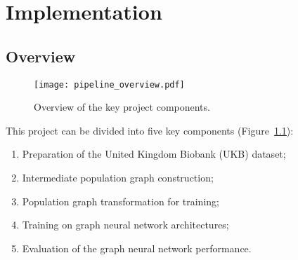 \chapter{Implementation}


\section{Overview}

\begin{figure}[]
    \centering
    \texttt{[image: pipeline\_overview.pdf]}
    \caption{Overview of the key project components.}\label{pipeline-overview}
\end{figure}

This project can be divided into five key components (Figure~\ref{pipeline-overview}):
\begin{enumerate}
    \item Preparation of the United Kingdom Biobank (UKB) dataset;
    \item Intermediate population graph construction;
    \item Population graph transformation for training;
    \item Training on graph neural network architectures;
    \item Evaluation of the graph neural network performance.
\end{enumerate}

